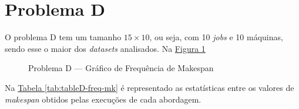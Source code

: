 \section{Problema D}
O problema D tem um tamanho $15 \times 10$, ou seja, com 10 \textit{jobs} e 10 máquinas, 
sendo esse o maior dos \textit{datasets} analisados.
Na \hyperref[fig:plobD-freq-mk]{Figura \ref{fig:plobD-freq-mk}} 
\begin{figure}[!htb]
    \caption{Problema D — Gráfico de Frequência de Makespan}
    \label{fig:plobD-freq-mk}
    \begin{minipage}{.5\linewidth}
        \centering
        \subfloat[]{
            \label{plobD-freq-mk:a}
            \resizebox{\linewidth}{!}{}
        }
    \end{minipage}%
    \begin{minipage}{.5\linewidth}
        \centering
        \subfloat[]{
            \label{plobD-freq-mk:b}
            \resizebox{\linewidth}{!}{}
        }
    \end{minipage}\par\medskip
      \centering
      \subfloat[]{
        \label{plobD-freq-mk:c}
        \resizebox{.5\linewidth}{!}{}
      }
\end{figure}
Na
\hyperref[tab:tableD-freq-mk]{Tabela \ref{tab:tableD-freq-mk}}
é representado as estatísticas entre os valores de \textit{makespan} obtidos pelas execuções de cada abordagem.
